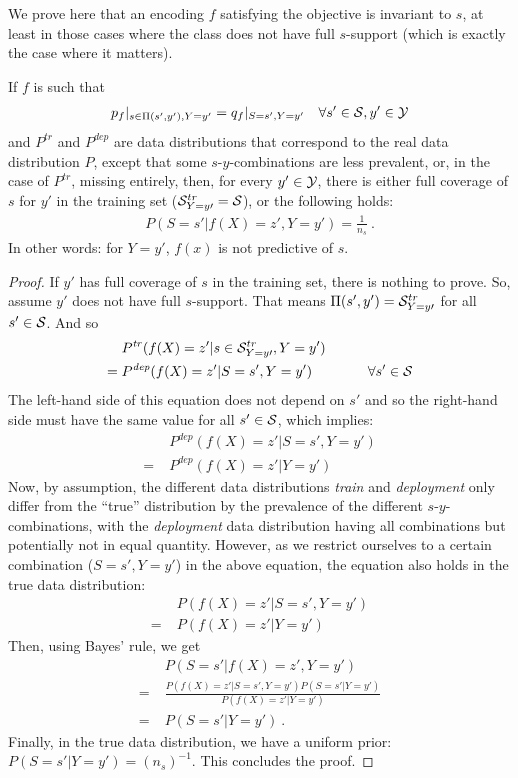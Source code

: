 We prove here that an encoding $f$ satisfying the objective is invariant to \(s\), at least in
those cases where the class does not have full \(s\)-support (which is exactly the case where it
matters).

\begin{theorem}
If \(f\) is such that
\begin{align}
p_f|_{s\in \Pi(s',y'),Y=y'} = q_f|_{S=s',Y=y'}\quad\forall s'\in{\mathcal{S}}, y' \in{\mathcal{Y}}
\end{align}
%
and \(P^\mathit{tr}\) and \(P^\mathit{dep}\) are data distributions that correspond to the real
data distribution \(P\), except that some \(s\)-\(y\)-combinations are less prevalent, or, in the
case of \(P^\mathit{tr}\), missing entirely, then, for every \(y'\in{\mathcal{Y}}\), there is either full
coverage of \(s\) for \(y'\) in the training set (\({\mathcal{S}}^{tr}_{Y=y\prime}={\mathcal{S}}\)), or the following
holds:
%
\begin{align}
P(S=s'|f(X)=z', Y=y')=\frac{1}{n_s}~.
\end{align}
%
In other words: for \(Y=y'\), \(f(x)\) is not predictive of \(s\).
\end{theorem}

\begin{proof}
If \(y'\) has full coverage of \(s\) in the training set, there is nothing to prove.
%
So, assume \(y'\) does not have full \(s\)-support.
%
That means \(\Pi(s',y')={\mathcal{S}}^{tr}_{Y=y\prime} \) for all \(s'\in {\mathcal{S}}\).
%
And so
%
\begin{align}
&P^\mathit{tr}(f(X)=z'|s\in {\mathcal{S}}^{tr}_{Y=y\prime}, Y=y')\\
  =\;&P^\mathit{dep}(f(X)=z'|S=s', Y=y')\quad\quad\quad\quad\forall s'\in{\mathcal{S}} \nonumber
\end{align}
%
The left-hand side of this equation does not depend on \(s'\)
and so the right-hand side must have the same value for all \(s'\in{\mathcal{S}}\), which implies:
\begin{align}
&P^\mathit{dep}(f(X)=z'|S=s', Y=y') \nonumber\\
  =\;&P^\mathit{dep}(f(X)=z'|Y=y')
\end{align}
%
Now, by assumption, the different data distributions \emph{train} and \emph{deployment} only differ
from the ``true'' distribution by the prevalence of the different \(s\)-\(y\)-combinations, with
the \emph{deployment} data distribution having all combinations but potentially not in equal
quantity. However, as we restrict ourselves to a certain combination (\(S=s',Y=y'\)) in the above
equation, the equation also holds in the true data distribution:
%
\begin{align}
&P(f(X)=z'|S=s', Y=y') \nonumber\\
=\;&P(f(X)=z'|Y=y')
\end{align}
%
Then, using Bayes' rule, we get
%
\begin{align}
&P(S=s'|f(X)=z', Y=y') \nonumber\\
=\;&\frac{P(f(X)=z'|S=s', Y=y')P(S=s'|Y=y')}{P(f(X)=z'|Y=y')} \nonumber\\
=\;&P(S=s'| Y=y')~.
\end{align}
%
Finally, in the true data distribution, we have a uniform prior:
\(P(S=s'|Y=y')=(n_s)^{-1}\). This concludes the proof.
\end{proof}
%
